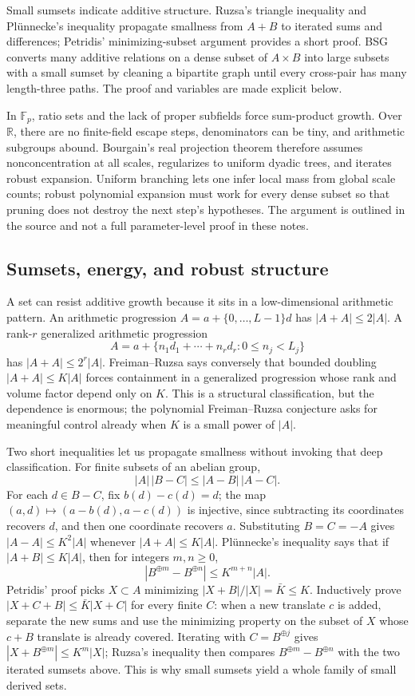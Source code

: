 Small sumsets indicate additive structure. Ruzsa's triangle inequality and Plünnecke's inequality propagate smallness from \(A+B\) to iterated sums and differences; Petridis' minimizing-subset argument provides a short proof. BSG converts many additive relations on a dense subset of \(A\times B\) into large subsets with a small sumset by cleaning a bipartite graph until every cross-pair has many length-three paths. The proof and variables are made explicit below.

In \(\mathbb F_p\), ratio sets and the lack of proper subfields force sum-product growth. Over \(\mathbb R\), there are no finite-field escape steps, denominators can be tiny, and arithmetic subgroups abound. Bourgain's real projection theorem therefore assumes nonconcentration at all scales, regularizes to uniform dyadic trees, and iterates robust expansion. Uniform branching lets one infer local mass from global scale counts; robust polynomial expansion must work for every dense subset so that pruning does not destroy the next step's hypotheses. The argument is outlined in the source and not a full parameter-level proof in these notes.

\subsection{Sumsets, energy, and robust structure}\label{04-visual-computing-ii-ch033-sumsets-energy-and-robust-structure}

A set can resist additive growth because it sits in a low-dimensional arithmetic pattern. An arithmetic progression \(A=a+\{0,\ldots,L-1\}d\) has \(|A+A|\le 2|A|\). A rank-\(r\) generalized arithmetic progression \[
A=a+\{n_1d_1+\cdots+n_rd_r:0\le n_j<L_j\}
\] has \(|A+A|\le 2^r|A|\). Freiman--Ruzsa says conversely that bounded doubling \(|A+A|\le K|A|\) forces containment in a generalized progression whose rank and volume factor depend only on \(K\). This is a structural classification, but the dependence is enormous; the polynomial Freiman--Ruzsa conjecture asks for meaningful control already when \(K\) is a small power of \(|A|\).

Two short inequalities let us propagate smallness without invoking that deep classification. For finite subsets of an abelian group, \[
|A|\,|B-C|\le |A-B|\,|A-C|.
\] For each \(d\in B-C\), fix \(b(d)-c(d)=d\); the map \((a,d)\mapsto(a-b(d),a-c(d))\) is injective, since subtracting its coordinates recovers \(d\), and then one coordinate recovers \(a\). Substituting \(B=C=-A\) gives \(|A-A|\le K^2|A|\) whenever \(|A+A|\le K|A|\). Plünnecke's inequality says that if \(|A+B|\le K|A|\), then for integers \(m,n\ge0\), \[
|B^{\oplus m}-B^{\oplus n}|\le K^{m+n}|A|.
\] Petridis' proof picks \(X\subset A\) minimizing \(|X+B|/|X|=\bar K\le K\). Inductively prove \(|X+C+B|\le\bar K|X+C|\) for every finite \(C\): when a new translate \(c\) is added, separate the new sums and use the minimizing property on the subset of \(X\) whose \(c+B\) translate is already covered. Iterating with \(C=B^{\oplus j}\) gives \(|X+B^{\oplus m}|\le K^m|X|\); Ruzsa's inequality then compares \(B^{\oplus m}-B^{\oplus n}\) with the two iterated sumsets above. This is why small sumsets yield a whole family of small derived sets.

